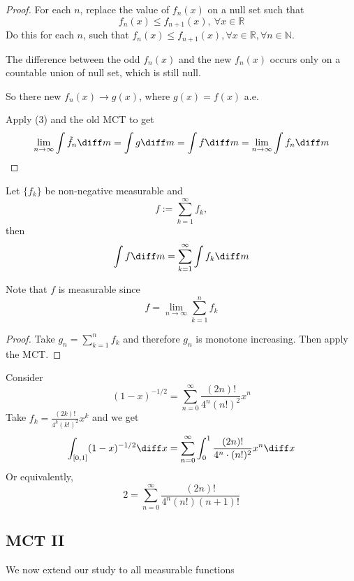 \begin{proof}
For each $n$, replace the value of $f_n(x)$ on a null set such that 
\[
f_n(x)\le f_{n+1}(x), \ \forall x\in\mathbb{R}
\]
Do this for each $n$, such that $f_n(x)\le f_{n+1}(x),\forall x\in\mathbb{R},\forall n\in\mathbb{N}$.

The difference between the odd $f_n(x)$ and the new $f_n(x)$ occurs only on a countable union of null set, which is still null.

So there new $f_n(x)\to g(x)$, where $g(x)=f(x)$ a.e.

Apply (3) and the old MCT to get 
\[
\lim_{n\to\infty}\int\tilde{f}_n\diff m=\int g\diff m = \int f\diff m=\lim_{n\to\infty}\int f_n\diff m
\]
\end{proof}

\begin{proposition}
Let $\{f_k\}$ be non-negative measurable and 
\[
f:=\sum_{k=1}^\infty f_k,
\]
then 
\[
\int f\diff m = \sum_{k=1}^\infty \int f_k\diff m
\]
\end{proposition}
Note that $f$ is measurable since
\[
f=\lim_{n\to\infty}\sum_{k=1}^nf_k
\]
\begin{proof}
Take $g_n = \sum_{k=1}^nf_k$ and therefore $g_n$ is monotone increasing. Then apply the MCT.
\end{proof}
\begin{example}
Consider
\[
(1-x)^{-1/2} = \sum_{n=0}^\infty\frac{(2n)!}{4^n(n!)^2}x^n
\]
Take $f_k = \frac{(2k)!}{4^k(k!)^2}x^k$ and we get
\[
\int_{[0,1]}(1-x)^{-1/2}\diff x=\sum_{n=0}^\infty\int_0^1\frac{(2n)!}{4^n\cdot (n!)^2}x^n\diff x
\]
Or equivalently,
\[
2 = \sum_{n=0}^\infty\frac{(2n)!}{4^n(n!)(n+1)!}
\]

\end{example}
\subsection{MCT II}
We now extend our study to all measurable functions


